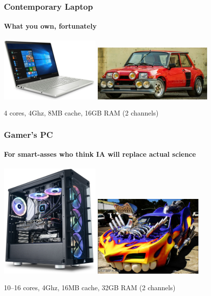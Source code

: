 \documentclass[xcolor={x11names,svgnames,psnames}]{beamer}
\begin{document}
\begin{frame}
  \frametitle{Contemporary Laptop}
  \framesubtitle{What you own, fortunately}
  
  \centering
  \includegraphics[width=5cm]{laptop}%
  \includegraphics[width=6cm]{r5maxi}

    \bigskip

  4 cores, 4Ghz, 8MB cache, 16GB RAM (2 channels)
\end{frame}


\begin{frame}
  \frametitle{Gamer's PC}
  \framesubtitle{For smart-asses who think IA will replace actual science}
  
  \centering
  \includegraphics[width=5cm]{gamer}%
  \hfill%
  \includegraphics[width=5.5cm]{tuning}

    \bigskip

    10--16 cores, 4Ghz, 16MB cache, 32GB RAM (2 channels)
\end{frame}
\end{document}
